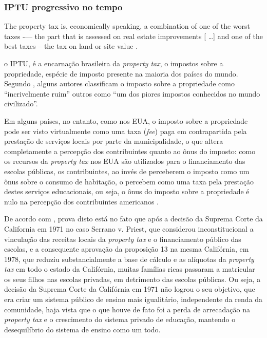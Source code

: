\documentclass[
	12pt,				%
	oneside,			%
	a4paper,			%
	chapter=TITLE,		%
	section=TITLE,		%
	english,			%
	brazil				%
	]{abntex2}
\begin{document}
\begin{refsection}
\hypertarget{iptu-progressivo-no-tempo}{%
\subsubsection{IPTU progressivo no tempo}\label{iptu-progressivo-no-tempo}}
\begin{citacao}
The property tax is, economically speaking, a combination of one of the worst
taxes -— the part that is assessed on real estate improvements [ \ldots] and one
of the best taxes -- the tax on land or site value .
\end{citacao}
o \gls{IPTU}, é a encarnação brasileira da \emph{property tax}, o impostos sobre a
propriedade, espécie de imposto presente na maioria dos países do mundo. Segundo
\textcite[p.~101]{spinney}, alguns autores classificam o imposto sobre a propriedade como
``incrivelmente ruim'' outros como ``um dos piores impostos conhecidos no mundo
civilizado''.

Em alguns países, no entanto, como nos \gls{EUA}, o imposto sobre a propriedade
pode ser visto virtualmente como uma taxa (\emph{fee}) paga em contrapartida pela
prestação de serviços locais por parte da municipalidade, o que altera
completamente a percepção dos contribuintes quanto ao ônus do imposto: como os
recursos da \emph{property tax} nos \gls{EUA} são utilizados para o financiamento das
escolas públicas, os contribuintes, ao invés de perceberem o imposto como um
ônus sobre o consumo de habitação, o percebem como uma taxa pela prestação
destes serviços educacionais, ou seja, o ônus do imposto sobre a propriedade é
nulo na percepção dos contribuintes americanos \autocites[p.~468]{fischel1989}[p.~20]{fischel2013}.

De acordo com \textcite[p.~21]{fischel2013}, prova disto está no fato que após a decisão
da Suprema Corte da California em 1971 no caso Serrano v. Priest, que considerou
inconstitucional a vinculação das receitas locais da \emph{property tax} e o
financiamento público das escolas, e a consequente aprovação da proposição 13 na
mesma Califórnia, em 1978, que reduziu substancialmente a base de cálculo e as
alíquotas da \emph{property tax} em todo o estado da Califórnia, muitas famílias
ricas passaram a matricular os seus filhos nas escolas privadas, em detrimento
das escolas públicas. Ou seja, a decisão da Suprema Corte da Califórnia em 1971
não logrou o seu objetivo, que era criar um sistema público de ensino mais
igualitário, independente da renda da comunidade, haja vista que o que houve de
fato foi a perda de arrecadação na \emph{property tax} e o crescimento do sistema
privado de educação, mantendo o desequilíbrio do sistema de ensino como um todo.


\end{refsection}
\end{document}
